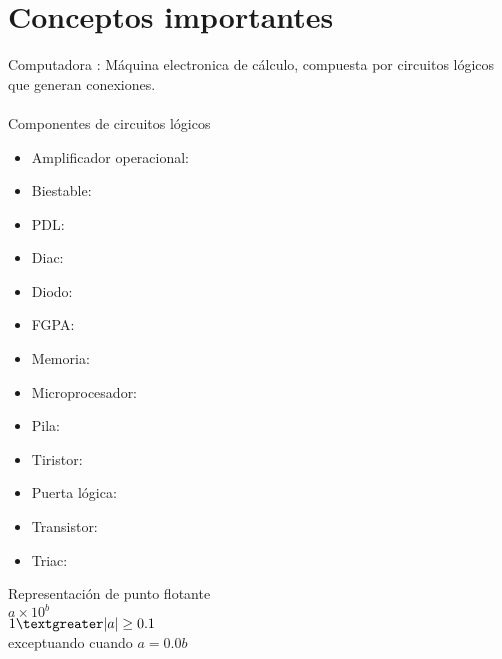 \chapter{Conceptos importantes}
Computadora : M\'aquina electronica de c\'alculo, compuesta por circuitos l\'ogicos que generan conexiones.
\\ \\
Componentes de circuitos lógicos 

\begin{itemize}
\item Amplificador operacional:
\item Biestable:
\item PDL:
\item Diac:
\item Diodo:
\item FGPA: 
\item Memoria:
\item Microprocesador:
\item Pila:
\item Tiristor:
\item Puerta l\'ogica:
\item Transistor:
\item Triac: 
\end{itemize}



Representaci\'on de punto flotante \\
$a \times 10^b$\\
$1 \textgreater |a| \geq 0.1$\\
exceptuando cuando $a=0.0b$ \\

